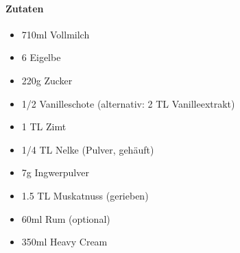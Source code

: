 
\paragraph{Zutaten}
\begin{itemize}[noitemsep]
	\item 710ml Vollmilch
	\item 6 Eigelbe
	\item 220g Zucker
	\item 1/2 Vanilleschote (alternativ: 2 TL Vanilleextrakt)
	\item 1 TL Zimt
	\item 1/4 TL Nelke (Pulver, gehäuft)
	\item 7g Ingwerpulver
	\item 1.5 TL Muskatnuss (gerieben)
	\item 60ml Rum (optional)
	\item 350ml Heavy Cream
\end{itemize}


